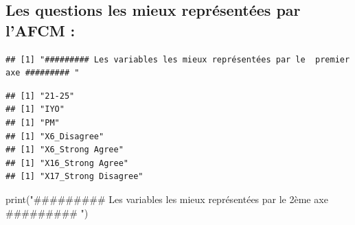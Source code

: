 \documentclass[
]{article}
\newenvironment{Shaded}{\begin{snugshade}}{\end{snugshade}}
\newcommand{\AttributeTok}[1]{\textcolor[rgb]{0.77,0.63,0.00}{#1}}
\newcommand{\ControlFlowTok}[1]{\textcolor[rgb]{0.13,0.29,0.53}{\textbf{#1}}}
\newcommand{\DecValTok}[1]{\textcolor[rgb]{0.00,0.00,0.81}{#1}}
\newcommand{\FloatTok}[1]{\textcolor[rgb]{0.00,0.00,0.81}{#1}}
\newcommand{\FunctionTok}[1]{\textcolor[rgb]{0.00,0.00,0.00}{#1}}
\newcommand{\NormalTok}[1]{#1}
\newcommand{\OtherTok}[1]{\textcolor[rgb]{0.56,0.35,0.01}{#1}}
\newcommand{\SpecialCharTok}[1]{\textcolor[rgb]{0.00,0.00,0.00}{#1}}
\newcommand{\StringTok}[1]{\textcolor[rgb]{0.31,0.60,0.02}{#1}}
\begin{document}
\hypertarget{les-questions-les-mieux-repruxe9sentuxe9es-par-lafcm}{%
\subsection{Les questions les mieux représentées par l'AFCM
:}\label{les-questions-les-mieux-repruxe9sentuxe9es-par-lafcm}}

\begin{Shaded}
\end{Shaded}

\begin{verbatim}
## [1] "######### Les variables les mieux représentées par le  premier axe ######### "
\end{verbatim}

\begin{Shaded}
\end{Shaded}

\begin{verbatim}
## [1] "21-25"
## [1] "IYO"
## [1] "PM"
## [1] "X6_Disagree"
## [1] "X6_Strong Agree"
## [1] "X16_Strong Agree"
## [1] "X17_Strong Disagree"
\end{verbatim}

\begin{Shaded}
\begin{Highlighting}[]
\FunctionTok{print}\NormalTok{(}\StringTok{"\#\#\#\#\#\#\#\#\# Les variables les mieux représentées par le 2ème axe \#\#\#\#\#\#\#\#\# "}\NormalTok{)}
\end{Highlighting}
\end{Shaded}
\end{document}
